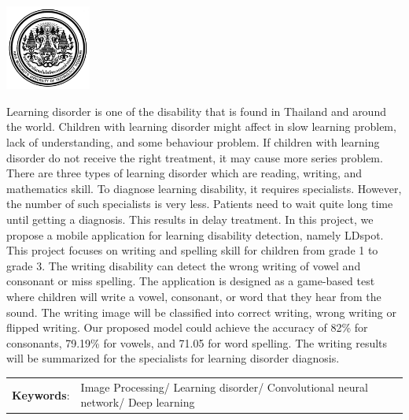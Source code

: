 \documentclass[12pt,oneside,openright,a4paper]{cpe-thai-project}
\begin{document}
\pdfstringdefDisableCommands{%
\let\MakeUppercase\relax
}
\begin{center}
\includegraphics[width=2.8cm]{logo02.jpg}
\end{center}
\vspace*{-1cm}
\maketitlepage
\makesignaturepage 

\abstract

Learning disorder is one of the disability that is found in Thailand and around the world.
  Children with learning disorder might affect in slow learning problem,
   lack of understanding, and some behaviour problem.
    If children with learning disorder do not receive the right treatment,
     it may cause more series problem. There are three types of learning disorder which are reading, writing,
      and mathematics skill. To diagnose learning disability, it requires specialists. However,
       the number of such specialists is very less. Patients need to wait quite long time until getting a diagnosis. This results in delay treatment.
        In this project, we propose a mobile application for learning disability detection,
         namely LDspot. This project focuses on writing and spelling skill for children from grade 1 to grade 3.
          The writing disability can detect the wrong writing of vowel and consonant or miss spelling.
           The application is designed as a game-based test where children will write a vowel, consonant,
            or word that they hear from the sound. The writing image will be classified into correct writing,
             wrong writing or flipped writing. Our proposed model could achieve the accuracy of 82\% for consonants,
              79.19\% for vowels, and 71.05 for word spelling. The writing results will be summarized for the specialists for learning disorder diagnosis.
\begin{flushleft}
\begin{tabular*}{\textwidth}{@{}lp{}}
\textbf{Keywords}: & Image Processing/ Learning disorder/ Convolutional neural network/ Deep learning
\end{tabular*}
\end{flushleft}
\endabstract
\end{document}
